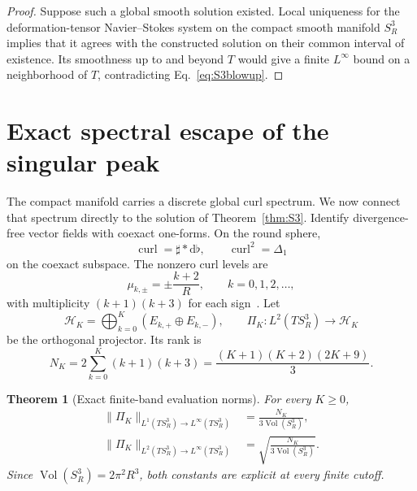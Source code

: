 \documentclass[aps,prd,reprint,superscriptaddress,nofootinbib,floatfix]{revtex4-2}
\newtheorem{theorem}{Theorem}
\theoremstyle{definition}
\theoremstyle{remark}
\newcommand{\dd}{\mathrm{d}}
\newcommand{\Vol}{\operatorname{Vol}}
\begin{document}
\begin{proof}
	Suppose such a global smooth solution existed.  Local uniqueness for the deformation-tensor Navier--Stokes system on the compact smooth manifold $S^3_R$ implies that it agrees with the constructed solution on their common interval of existence.  Its smoothness up to and beyond $T$ would give a finite $L^\infty$ bound on a neighborhood of $T$, contradicting Eq.~\eqref{eq:S3blowup}.
\end{proof}



\section{Exact spectral escape of the singular peak}\label{sec:spectralescape}

The compact manifold carries a discrete global curl spectrum.  We now connect that spectrum directly to the solution of Theorem~\ref{thm:S3}.  Identify divergence-free vector fields with coexact one-forms.  On the round sphere,
\begin{equation}
	\operatorname{curl}=\sharp *\dd\flat ,
	\qquad
	\operatorname{curl}^2=\Delta_1
\end{equation}
on the coexact subspace.  The nonzero curl levels are
\begin{equation}
	\mu_{k,\pm}=\pm\frac{k+2}{R},\qquad k=0,1,2,\ldots,
	\label{eq:curllevels}
\end{equation}
with multiplicity $(k+1)(k+3)$ for each sign~\cite{IkedaTaniguchi1978,EncisoGernerPeralta2023}.  Let
\begin{equation}
	\mathcal H_K=\bigoplus_{k=0}^K(E_{k,+}\oplus E_{k,-}),
	\qquad
	\Pi_K:L^2(TS^3_R)\to\mathcal H_K
\end{equation}
be the orthogonal projector. Its rank is
\begin{equation}
	N_K=2\sum_{k=0}^K(k+1)(k+3)
	=\frac{(K+1)(K+2)(2K+9)}{3}.
	\label{eq:NK}
\end{equation}

\begin{theorem}[Exact finite-band evaluation norms]\label{thm:evalnorms}
	For every $K\ge0$,
	\begin{align}
		\|\Pi_K\|_{L^1(TS^3_R)\to L^\infty(TS^3_R)}
		 & =\frac{N_K}{3\Vol(S^3_R)},\label{eq:L1Linf}        \\
		\|\Pi_K\|_{L^2(TS^3_R)\to L^\infty(TS^3_R)}
		 & =\sqrt{\frac{N_K}{3\Vol(S^3_R)}}.\label{eq:L2Linf}
	\end{align}
	Since $\Vol(S^3_R)=2\pi^2R^3$, both constants are explicit at every finite cutoff.
\end{theorem}
\end{document}
